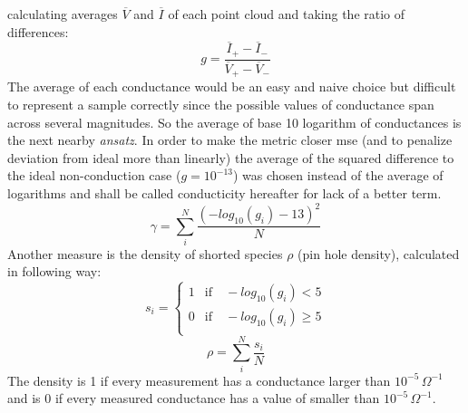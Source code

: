 calculating averages $\overline{V}$ and $\overline{I}$ of each point cloud and taking the ratio of differences:
\begin{equation}
    g = \frac{\overline{I}_{+} - \overline{I}_-}{\overline{V}_{+} - \overline{V}_-}
\end{equation}
%
The average of each conductance would be an easy and naive choice but difficult to represent a 
sample correctly since the possible values of conductance span across several magnitudes.
So the average of base 10 logarithm of conductances is the next nearby \textit{ansatz}.
%
In order to make the metric closer 
\gls{mse} (and to penalize deviation from ideal more than linearly) the average of the squared difference 
to the ideal non-conduction case ($g=10^{-13}$) was chosen instead of the average of logarithms and shall be called conducticity hereafter for lack of a better term. 
%
\begin{equation}
    \gamma = \sum_i^N \frac{ (-log_{10}(g_i) - 13)^2}{N}
	\label{eq:gamma}
\end{equation}
Another measure is the density of shorted species $\rho$ (pin hole density), calculated in following way:
\begin{equation}
	s_i = \begin{cases}
        1 &\text{if} \quad -log_{10}(g_i) < 5 \\
        0 &\text{if} \quad -log_{10}(g_i) \geq 5 \\
	\end{cases}
\end{equation}
\begin{equation}
	\rho = \sum_i^N \frac{s_i}{N}
	\label{eq:rho}
\end{equation}
The density is 1 if every measurement has a conductance larger than $10^{-5} \, \Omega^{-1}$ and is 0 if every measured conductance has a value of smaller than $10^{-5} \, \Omega^{-1}$.
%

